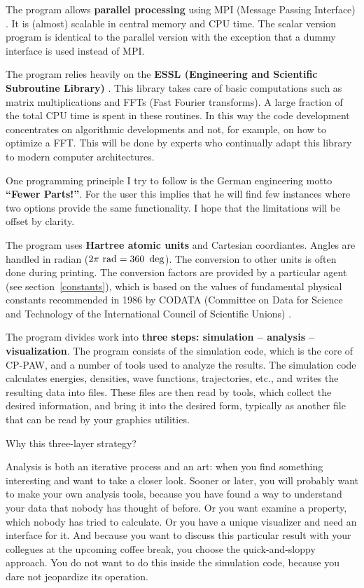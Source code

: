 \documentclass[final,12pt]{article}
\begin{document}
The program allows {\bf parallel processing} using MPI (Message
Passing Interface) \cite{MPI}. It is (almost) scalable in central
memory and CPU time.  The scalar version program is identical to the
parallel version with the exception that a dummy interface is used
instead of MPI.

The program relies heavily on the {\bf ESSL (Engineering and
  Scientific Subroutine Library)} \cite{ESSL}.  This library takes
care of basic computations such as matrix multiplications and FFTs
(Fast Fourier transforms). A large fraction of the total CPU time is
spent in these routines. In this way the code development concentrates
on algorithmic developments and not, for example, on how to optimize a
FFT.  This will be done by experts who continually adapt this library
to modern computer architectures.

One programming principle I try to follow is the German engineering
motto {\bf ``Fewer Parts!''}. For the user this implies that he will
find few instances where two options provide the same functionality. I
hope that the limitations will be offset by clarity.

The program uses {\bf Hartree atomic units} and Cartesian coordiantes.
Angles are handled in radian ($2\pi{\rm\ rad}= 360~\deg$).
The conversion to other units is often done during printing. The
conversion factors are provided by a particular agent (see
section~\ref{constants}), which is based on the values of fundamental
physical constants recommended in 1986 by CODATA (Committee on Data
for Science and Technology of the International Council of Scientific
Unions) \cite{Constants}.

The program divides work into {\bf three steps: simulation --
  analysis -- visualization}.  The program consists of the simulation
code, which is the core of CP-PAW, and a number of tools used to
analyze the results.  The simulation code calculates energies,
densities, wave functions, trajectories, etc., and writes the
resulting data into files.  These files are then read by tools, which
collect the desired information, and bring it into the desired
form, typically as another file that can be read by your graphics
utilities.

Why this three-layer strategy?

Analysis is both an iterative process and an art: when you find something
interesting and want to take a closer look. Sooner or later, you will
probably want to make your own analysis tools, because you have found a way
to understand your data that nobody has thought of before. Or you
want examine a property, which nobody has tried to calculate. Or
you have a unique visualizer and need an interface for it.  And
because you want to discuss this particular result with your collegues
at the upcoming coffee break, you choose the quick-and-sloppy
approach.  You do not want to do this inside the simulation code,
because you dare not jeopardize its operation.
\end{document}
